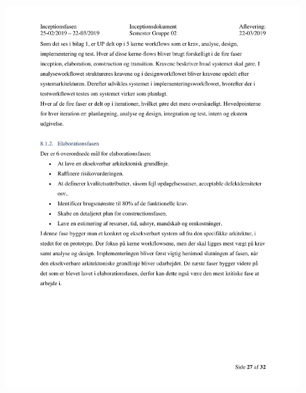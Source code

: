 \begin{figure}[hb]
  \includegraphics[scale = 0.33]{./PNG/Inceptions/Gruppe02+InceptionsDokument-28.jpg} 
\end{figure}

